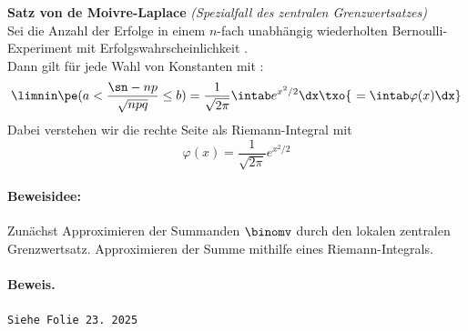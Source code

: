 \begin{satz}
    \label{satz:Moivre-Laplace}
    \textbf{Satz von de Moivre-Laplace} \textit{(Spezialfall des zentralen Grenzwertsatzes)} \\
    Sei \ma{\sn} die Anzahl der Erfolge in einem $n$-fach unabhängig wiederholten
    Bernoulli-Experiment mit Erfolgswahrscheinlichkeit . \\
    Dann gilt für jede Wahl von Konstanten  mit :
    \begin{equation}
        \limnin \pe( a < \frac{\sn - np}{\sqrt{npq}} \leq b) = \frac{1}{\sqrt{2\pi}} \intab e^{x^2 / 2} \dx \txo{ \ =
            \intab \varphi(x) \dx}\label{eq:equation2}
    \end{equation}
    Dabei verstehen wir die rechte Seite als Riemann-Integral  mit
    \begin{equation}
        \varphi(x) =  \frac{1}{\sqrt{2\pi}}   e^{x^2 / 2}\label{eq:equation3}
    \end{equation}

    \paragraph{Beweisidee:}
    Zunächst Approximieren der Summanden $\binomv$ durch den lokalen zentralen
    Grenzwertsatz.
    Approximieren der Summe mithilfe eines Riemann-Integrals.

    \paragraph{Beweis.}
    \texttt{Siehe Folie 23. 2025} %
\end{satz}
